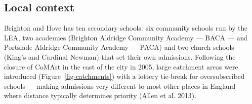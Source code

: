 \documentclass[
  12pt,
  titlepage]{article}
\begin{document}
\subsection{Local context}\label{local-context}

Brighton and Hove has ten secondary schools: six community schools run
by the LEA, two academies (Brighton Aldridge Community Academy --- BACA
--- and Portslade Aldridge Community Academy --- PACA) and two church
schools (King's and Cardinal Newman) that set their own admissions.
Following the closure of CoMArt in the east of the city in 2005, large
catchment areas were introduced (Figure~\ref{fig-catchments}) with a
lottery tie-break for oversubscribed schools --- making admissions very
different to most other places in England where distance typically
determines priority (Allen et al. 2013).
\end{document}
